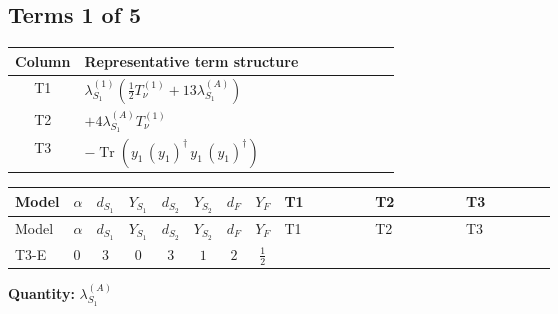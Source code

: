 \documentclass[8pt]{article}
\begin{document}
\begin{landscape}
\subsection*{Terms 1 of 5}
\begin{center}
\begin{tabular}{@{}c >{\raggedright\arraybackslash}p{0.82\linewidth}@{}}
\toprule
Column & Representative term structure \\
\midrule
T1 & \(\displaystyle {\lambda_{S_1}^{(1)}} \left(\frac{1}{2} T_{\nu}^{(1)}+13 {\lambda_{S_1}^{(A)}}\right)\) \\
\midrule
T2 & \(\displaystyle +4 {\lambda_{S_1}^{(A)}} T_{\nu}^{(1)}\) \\
\midrule
T3 & \(\displaystyle -\operatorname{Tr}\!\left({y_1}\,\left({y_1}\right)^{\dagger}\,{y_1}\,\left({y_1}\right)^{\dagger}\right)\) \\
\midrule
\bottomrule
\end{tabular}
\end{center}
\smallskip
\tiny
\begin{longtable}{@{}llcccccc >{\raggedright\arraybackslash}p{0.21\linewidth} >{\raggedright\arraybackslash}p{0.21\linewidth} >{\raggedright\arraybackslash}p{0.21\linewidth}@{}}
\toprule
Model & $\alpha$ & $d_{S_1}$ & $Y_{S_1}$ & $d_{S_2}$ & $Y_{S_2}$ & $d_F$ & $Y_F$ & T1 & T2 & T3 \\
\midrule
\endfirsthead
\toprule
Model & $\alpha$ & $d_{S_1}$ & $Y_{S_1}$ & $d_{S_2}$ & $Y_{S_2}$ & $d_F$ & $Y_F$ & T1 & T2 & T3 \\
\midrule
\endhead
T3-E & $0$ & $3$ & $0$ & $3$ & $1$ & $2$ & $\frac{1}{2}$ & \scriptsize\adjustbox{max width=\linewidth}{$\begin{gathered} {\lambda_{S_1}^{(1)}} \left(\frac{1}{2} T_{\nu}^{(1)}+13 {\lambda_{S_1}^{(A)}}\right)\end{gathered}$} & \scriptsize\adjustbox{max width=\linewidth}{$\begin{gathered} +4 {\lambda_{S_1}^{(A)}} T_{\nu}^{(1)}\end{gathered}$} & \scriptsize\adjustbox{max width=\linewidth}{$\begin{gathered} -\operatorname{Tr}\!\left({y_1}\,\left({y_1}\right)^{\dagger}\,{y_1}\,\left({y_1}\right)^{\dagger}\right)\end{gathered}$} \\
\midrule
\bottomrule
\end{longtable}
\clearpage
\noindent\textbf{Quantity: }$\lambda_{S_1}^{(A)}$\par\smallskip

\end{landscape}
\end{document}
